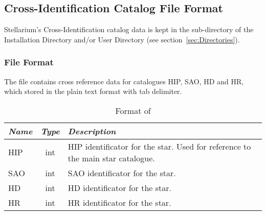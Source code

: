 \subsection{Cross-Identification Catalog File Format}
\label{sec:StarCatalogues:CrossIdentificationData:format}


Stellarium's Cross-Identification catalog data is kept
in the  sub-directory of the Installation Directory and/or User Directory (see section~\ref{sec:Directories}).

\subsubsection{File Format}
\label{sec:StarCatalogues:CrossIdentificationData:file}

The file  contains cross reference data for catalogues HIP, SAO, HD and HR, which stored in the plain text format with tab delimiter.

\begin{table}[htb]
\begin{tabularx}{\textwidth}{l|c|X}\toprule
\emph{Name} & \emph{Type} & \emph{Description}\\\midrule
HIP	& int & HIP identificator for the star. Used for reference to the main star catalogue.\\%
SAO	& int & SAO identificator for the star.\\%
HD	& int & HD identificator for the star.\\%
HR	& int & HR identificator for the star.\\\bottomrule
\end{tabularx}
\caption{Format of }
\label{tab:StarCatalogues:CrossIdentificationData:file}
\end{table}


